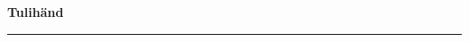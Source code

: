 \documentclass[10pt]{book}
\begin{document}
{
  \samepage
  \raggedbottom
  \raggedright
  \sloppy


  \vspace{0.2in}

  \noindent\begin{minipage}{.1\textwidth}
    \hfill\vspace{0.1in}
  \end{minipage}%
  \noindent\begin{minipage}{.8\textwidth}
    \centering
    \bfseries
    \large Tulih\"and
  \end{minipage}%
  \noindent\begin{minipage}{.1\textwidth}
      \hfill\vspace{0.1in}
  \end{minipage}

  \nopagebreak[4]
  \vspace{0.1in}
  \nopagebreak[4]
  \hrule height 0.05ex
  \nopagebreak[4]
  \vspace{-0.05in}




}
\end{document}

